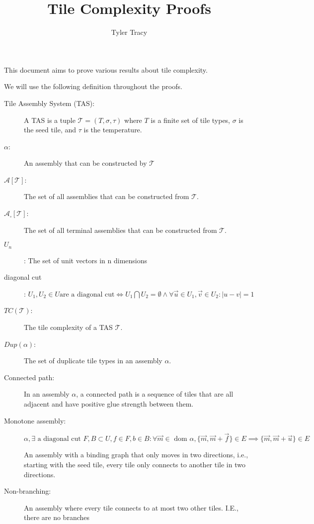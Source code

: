\documentclass[12pt]{article}
\title{Tile Complexity Proofs}
\author{Tyler Tracy}
\begin{document}
\maketitle

This document aims to prove various results about tile complexity.

We will use the following definition throughout the proofs.

\begin{description}
    \item[Tile Assembly System (TAS):] A TAS is a tuple $\mathcal{T} = (T, \sigma, \tau)$ where $T$ is a finite set of tile types, $\sigma$ is the seed tile, and $\tau$ is the temperature.
    \item[$\alpha$:] An assembly that can be constructed by $\mathcal{T}$
    \item[{$\mathcal{A}[\mathcal{T}]$}:] The set of all assemblies that can be constructed from $\mathcal{T}$.
    \item[{$\mathcal{A}_{\square}[\mathcal{T}]$}:] The set of all terminal assemblies that can be constructed from $\mathcal{T}$.

    \item[$U_n$]: The set of unit vectors in n dimensions

    \item[diagonal cut]: $ U_1, U_2 \in U \text{are a diagonal cut} \iff U_1 \bigcap U_2 = \emptyset \land \forall \vec{u} \in U_1, \vec{v} \in U_2 : |u - v| = 1$
    \item[{$TC(\mathcal{T})$}:] The tile complexity of a TAS $\mathcal{T}$.
    \item[$Dup(\alpha)$:] The set of duplicate tile types in an assembly $\alpha$.
    \item[Connected path:] In an assembly $\alpha$, a connected path is a sequence of tiles that are all adjacent and have positive glue strength between them.
    \item[Monotone assembly:] 
        $\alpha, \exists \text{ a diagonal cut } F, B \subset U, f \in F, b \in B: \forall \vec{m} \in \text{ dom } \alpha, \{\vec{m},\vec{m}+\vec{f}\} \in E \implies \{\vec{m},\vec{m}+\vec{u}\} \in E$

        An assembly with a binding graph that only moves in two directions, i.e., starting with the seed tile, every tile only connects to another tile in two directions.
    \item[Non-branching:] An assembly where every tile connects to at most two other tiles. I.E., there are no branches
\end{description}
\end{document}
